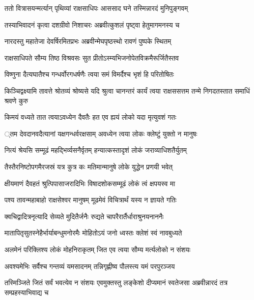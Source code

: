 
\twolineshloka
{ततो वित्रासयन्मर्त्यान् पृथिव्यां राक्षसाधिपः}
{आससाद घने तस्मिन्नारदं मुनिपुङ्गवम्} %

\twolineshloka
{तस्याभिवादनं कृत्वा दशग्रीवो निशाचरः}
{अब्रवीत्कुशलं पृष्ट्वा हेतुमागमनस्य च} %

\twolineshloka
{नारदस्तु महातेजा देवर्षिरमितप्रभः}
{अब्रवीन्मेघपृष्ठस्थो रावणं पुष्पके स्थितम्} %

\twolineshloka
{राक्षसाधिपते सौम्य तिष्ठ विश्रवसः सुत}
{प्रीतोऽस्म्यभिजनोपेतविक्रमैरूर्जितैस्तव} %

\twolineshloka
{विष्णुना दैत्यघातैश्च गन्धर्वोरगधर्षणैः}
{त्वया समं विमर्दैश्च भृशं हि परितोषितः} %

\threelineshloka
{किञ्चिद्वक्ष्यामि तावत्ते श्रोतव्यं श्रोष्यसे यदि}
{श्रुत्वा चानन्तरं कार्यं त्वया राक्षससत्तम}
{तन्मे निगदतस्तात समाधिं श्रवणे कुरु} %

\twolineshloka
{किमयं वध्यते तात त्वयाऽवध्येन दैवतैः}
{हत एव ह्ययं लोको यदा मृत्युवशं गतः} %

\threelineshloka
{्तम}
{देवदानवदैत्यानां यक्षगन्धर्वरक्षसाम्}
{अवध्येन त्वया लोकः क्लेष्टुं युक्तो न मानुषः} %

\twolineshloka
{नित्यं श्रेयसि सम्मूढं महद्भिर्व्यसनैर्वृतम्}
{हन्यात्कस्तादृशं लोकं जराव्याधिशतैर्युतम्} %

\twolineshloka
{तैस्तैरनिष्टोपगमैरजस्रं यत्र कुत्र कः}
{मतिमान्मानुषे लोके युद्धेन प्रणयी भवेत्} %

\twolineshloka
{क्षीयमाणं दैवहतं श्रुत्पिपासाजरादिभिः}
{विषादशोकसम्मूढं लोकं त्वं क्षपयस्व मा} %

\twolineshloka
{पश्य तावन्महाबाहो राक्षसेश्वर मानुषम्}
{मूढमेवं विचित्रार्थं यस्य न ज्ञायते गतिः} %

\twolineshloka
{क्वचिद्वादित्रनृत्यादि सेव्यते मुदितैर्जनैः}
{रुद्यते चापरैरार्तैर्धाराश्रुनयनाननैः} %

\twolineshloka
{मातापितृसुतस्नेहैर्भार्याबन्धुमनोरमैः}
{मोहितोऽयं जनो ध्वस्तः क्लेशं स्वं नावबुध्यते} %

\twolineshloka
{अलमेनं परिक्लिश्य लोकं मोहनिराकृतम्}
{जित एव त्वया सौम्य मर्त्यलोको न संशयः} %

\twolineshloka
{अवश्यमेभिः सर्वैश्च गन्तव्यं यमसादनम्}
{तन्निगृह्णीष्व पौलस्त्य यमं परपुरञ्जय} %

\threelineshloka
{तस्मिञ्जिते जितं सर्वं भवत्येव न संशयः}
{एवमुक्तस्तु लङ्केशो दीप्यमानं स्वतेजसा}
{अब्रवीन्नारदं तत्र सम्प्रहस्याभिवाद्य च} %

